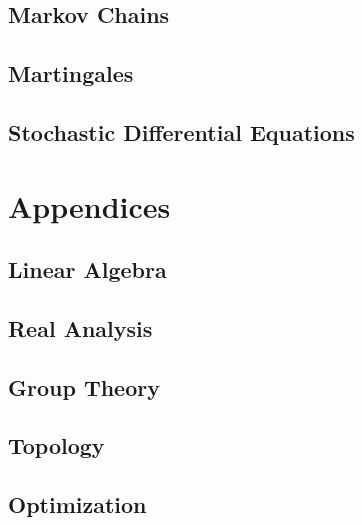 \documentclass[12pt]{book}
\theoremstyle{definition}
\begin{document}
\chapter{Markov Chains}


\chapter{Martingales}


\chapter{Stochastic Differential Equations}


\appendix

\part{Appendices}

\chapter{Linear Algebra}


\chapter{Real Analysis}


\chapter{Group Theory}


\chapter{Topology}


\chapter{Optimization}

\end{document}
